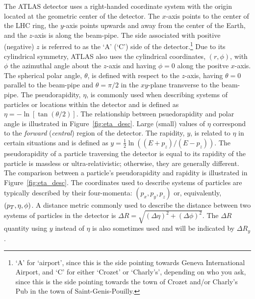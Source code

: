 The ATLAS detector uses a right-handed coordinate system with the origin located at
the geometric center of the detector.
The $x$-axis points to the center of the LHC ring, the $y$-axis points upwards
and away from the center of the Earth, and the $z$-axis is along the beam-pipe.
The side associated with positive (negative) $z$
is referred to as the `A' (`C') side of the detector.\footnote{`A' for `airport',
since this is the side pointing towards Geneva International Airport, and
`C' for either `Crozet' or `Charly's', depending on who you ask, since this is the side
pointing towards the town of Crozet and/or Charly's Pub in the town of Saint-Genis-Pouilly.}
Due to its cylindrical symmetry, ATLAS also uses the cylindrical coordinates, $(r,\phi)$,
with $\phi$ the azimuthal angle about the $z$-axis and having $\phi = 0$ along the positve $x$-axis.
The spherical polar angle, $\theta$, is defined with respect to the $z$-axis, having
$\theta = 0$ parallel to the beam-pipe and $\theta = \pi/2$ in the $xy$-plane transverse
to the beam-pipe.
The pseudorapidity, $\eta$, is commonly used when describing systems of particles or locations within
the detector and is defined as $\eta = - \ln \left[ \tan \left( \theta / 2 \right) \right ]$.
The relationship between psuedorapidity and polar angle is illustrated in Figure~\ref{fig:eta_desc}.
Large (small) values of $\eta$ correspond to the \textit{forward} (\textit{central}) region of the detector.
The rapidity, $y$, is related to $\eta$ in certain situations and is defined as $y = \frac{1}{2} \ln \left( (E+p_z) / (E-p_z) \right)$.
The pseudorapidity of a particle traversing the detector is equal to its rapidity of
the particle is massless or ultra-relativistic; otherwise, they are generally different.
The comparison between a particle's pseudorapidity and rapidity is illustrated in
Figure~\ref{fig:eta_desc}.
The coordinates used to describe systems of particles are typically described by their
four-momenta: $(p_x, p_y, p_z)$ or, equivalently, $(p_{T}, \eta, \phi)$.
A distance metric commonly used to describe the distance between two systems of particles
in the detector is $\Delta R = \sqrt{ (\Delta \eta)^2 + (\Delta \phi)^2 }$. The
$\Delta R$ quantity using $y$ instead of $\eta$ is also sometimes used and will be
indicated by $\Delta R_y$.




